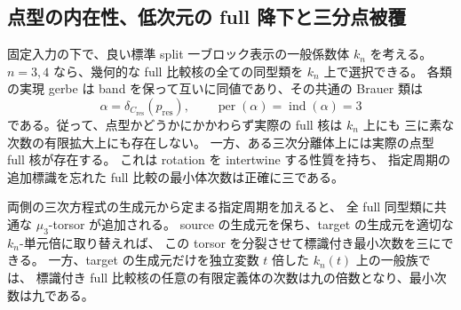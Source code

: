 \subsection{点型の内在性、低次元の full 降下と三分点被覆}
\begin{maintheorem}
\label{main:nfm-low-dimensional-full-descent}
固定入力の下で、良い標準 split 一ブロック表示の一般係数体 $k_n$ を考える。
$n=3,4$ なら、幾何的な full 比較核の全ての同型類を $k_n$ 上で選択できる。
各類の実現 gerbe は band を保って互いに同値であり、その共通の Brauer 類は
\[
 \alpha=\delta_{C_{\mathrm{res}}}(p_{\mathrm{res}}),
 \qquad\operatorname{per}(\alpha)=\operatorname{ind}(\alpha)=3
\]
である。従って、点型かどうかにかかわらず実際の full 核は $k_n$ 上にも
三に素な次数の有限拡大上にも存在しない。
一方、ある三次分離体上には実際の点型 full 核が存在する。
これは rotation を intertwine する性質を持ち、
指定周期の追加標識を忘れた full 比較の最小体次数は正確に三である。

両側の三次方程式の生成元から定まる指定周期を加えると、
全 full 同型類に共通な $\mu_3$-torsor が追加される。
source の生成元を保ち、target の生成元を適切な $k_n$-単元倍に取り替えれば、
この torsor を分裂させて標識付き最小次数を三にできる。
一方、target の生成元だけを独立変数 $t$ 倍した $k_n(t)$ 上の一般族では、
標識付き full 比較核の任意の有限定義体の次数は九の倍数となり、最小次数は九である。
\end{maintheorem}

